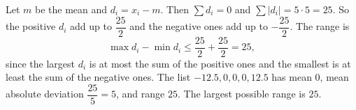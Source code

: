 Let $m$ be the mean and $d_i=x_i-m$. Then $\sum d_i=0$ and $\sum|d_i|=5\cdot5=25$. So the positive $d_i$ add up to $\dfrac{25}{2}$ and the negative ones add up to $-\dfrac{25}{2}$. The range is
\[\max d_i-\min d_i\le\dfrac{25}{2}+\dfrac{25}{2}=25,\]
since the largest $d_i$ is at most the sum of the positive ones and the smallest is at least the sum of the negative ones. The list $-12.5,0,0,0,12.5$ has mean $0$, mean absolute deviation $\dfrac{25}{5}=5$, and range $25$. The largest possible range is $\boxed{25}$.
